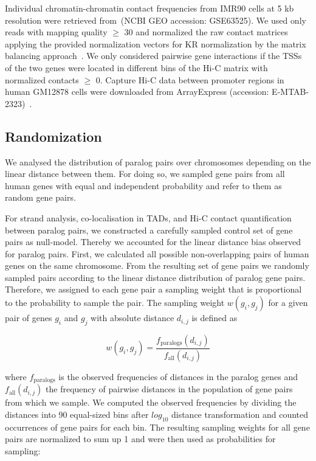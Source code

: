 \documentclass[a4paper,twoside=true,openright,parskip=full,chapterprefix=true,11pt,headings=normal,bibliography=totoc,listof=totoc,titlepage=on,captions=tableabove,draft=false]{scrreprt}
\theoremstyle{definition}
\theoremstyle{definition}
\theoremstyle{definition}
\theoremstyle{remark}
\begin{document}
Individual chromatin-chromatin contact frequencies from IMR90 cells at 5
kb resolution were retrieved from~\citep{Rao2014}(NCBI GEO accession:
GSE63525). We used only reads with mapping quality \(\geq\) 30 and
normalized the raw contact matrices applying the provided normalization
vectors for KR normalization by the matrix balancing
approach~\citep{Knight2013}. We only considered pairwise gene
interactions if the TSSs of the two genes were located in different bins
of the Hi-C matrix with normalized contacts \(\geq\) 0. Capture Hi-C
data between promoter regions in human GM12878 cells were downloaded
from ArrayExpress (accession: E-MTAB-2323)~\citep{Mifsud2015}.

\hypertarget{randomization}{%
\subsection{Randomization}\label{randomization}}

We analysed the distribution of paralog pairs over chromosomes depending
on the linear distance between them. For doing so, we sampled gene pairs
from all human genes with equal and independent probability and refer to
them as random gene pairs.

For strand analysis, co-localisation in TADs, and Hi-C contact
quantification between paralog pairs, we constructed a carefully sampled
control set of gene pairs as null-model. Thereby we accounted for the
linear distance bias observed for paralog pairs. First, we calculated
all possible non-overlapping pairs of human genes on the same
chromosome. From the resulting set of gene pairs we randomly sampled
pairs according to the linear distance distribution of paralog gene
pairs. Therefore, we assigned to each gene pair a sampling weight that
is proportional to the probability to sample the pair. The sampling
weight \(w(g_{i}, g_{j})\) for a given pair of genes \(g_{i}\) and
\(g_{j}\) with absolute distance \(d_{i,j}\) is defined as

\[
w(g_{i}, g_{j}) = \frac{ f_{\mathrm{paralogs}}(d_{i,j}) }{f_{\mathrm{all}}(d_{i,j})}
\]

where \(f_{\mathrm{paralogs}}\) is the observed frequencies of distances
in the paralog genes and \(f_{\mathrm{all}}(d_{i,j})\) the frequency of
pairwise distances in the population of gene pairs from which we sample.
We computed the observed frequencies by dividing the distances into 90
equal-sized bins after \(log_{10}\) distance transformation and counted
occurrences of gene pairs for each bin. The resulting sampling weights
for all gene pairs are normalized to sum up 1 and were then used as
probabilities for sampling:
\end{document}
